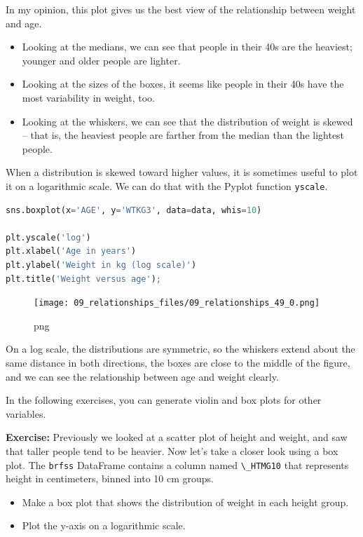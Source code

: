 \documentclass[
]{book}
\newcommand{\passthrough}[1]{#1}
\begin{document}
In my opinion, this plot gives us the best view of the relationship
between weight and age.

\begin{itemize}
\item
  Looking at the medians, we can see that people in their 40s are the
  heaviest; younger and older people are lighter.
\item
  Looking at the sizes of the boxes, it seems like people in their 40s
  have the most variability in weight, too.
\item
  Looking at the whiskers, we can see that the distribution of weight is
  skewed -- that is, the heaviest people are farther from the median
  than the lightest people.
\end{itemize}

When a distribution is skewed toward higher values, it is sometimes
useful to plot it on a logarithmic scale. We can do that with the Pyplot
function \passthrough{\lstinline!yscale!}.

\begin{lstlisting}[language=Python]
sns.boxplot(x='AGE', y='WTKG3', data=data, whis=10)

plt.yscale('log')
plt.xlabel('Age in years')
plt.ylabel('Weight in kg (log scale)')
plt.title('Weight versus age');
\end{lstlisting}

\begin{figure}
\centering
\texttt{[image: 09\_relationships\_files/09\_relationships\_49\_0.png]}
\caption{png}
\end{figure}

On a log scale, the distributions are symmetric, so the whiskers extend
about the same distance in both directions, the boxes are close to the
middle of the figure, and we can see the relationship between age and
weight clearly.

In the following exercises, you can generate violin and box plots for
other variables.

\textbf{Exercise:} Previously we looked at a scatter plot of height and
weight, and saw that taller people tend to be heavier. Now let's take a
closer look using a box plot. The \passthrough{\lstinline!brfss!}
DataFrame contains a column named \passthrough{\lstinline!\_HTMG10!}
that represents height in centimeters, binned into 10 cm groups.

\begin{itemize}
\item
  Make a box plot that shows the distribution of weight in each height
  group.
\item
  Plot the y-axis on a logarithmic scale.
\end{itemize}
\end{document}
